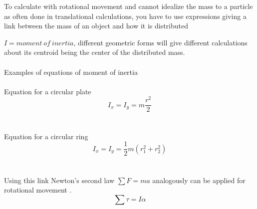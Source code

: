 \documentclass[11pt]{article}
\begin{document}

To calculate with rotational movement and cannot idealize the mass to a particle as often done in translational calculations,
you have to use expressions 
giving a link between the mass of an object and how it is distributed \parencite[339]{up}

$I = moment\: of \:inertia$, different geometric forms will give different calculations 
about its centroid being the center of the distributed mass.\\\\
Examples of equations of moment of inertia
\\\\
Equation for a circular plate
\begin{equation}
I_x=I_y=m\frac{r^2}{2}
\label{Iplate}
\end{equation}
\parencite[342]{up}
\\\\
Equation for a circular ring
\begin{equation}
I_x=I_y=\frac{1}{2}m(r^2_1+r^2_2)
\label{Iring}
\end{equation}
\parencite[342]{up}
\\\\
Using this link Newton's second law $\sum F=ma$ analogously can be applied for rotational movement \parencite[335]{up}. 
\begin{equation}\sum \tau = I\alpha\end{equation}
\end{document}
